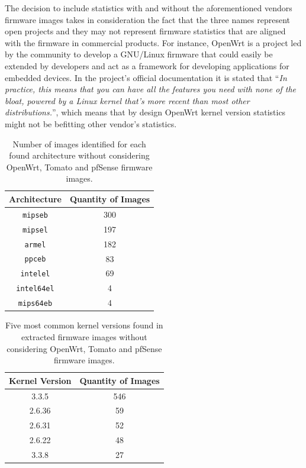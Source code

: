 The decision to include statistics with and without the aforementioned vendors firmware images takes in consideration the fact that the three names represent open projects and they may not represent firmware statistics that are aligned with the firmware in commercial products. For instance, OpenWrt is a project led by the community to develop a GNU/Linux firmware that could easily be extended by developers and act as a framework for developing applications for embedded devices. In the project's official documentation it is stated that ``\textit{In practice, this means that you can have all the features you need with none of the bloat, powered by a Linux kernel that's more recent than most other distributions.}'', which means that by design OpenWrt kernel version statistics might not be befitting other vendor's statistics.

\begin{table}[H]
\centering
\caption{Number of images identified for each found architecture without considering OpenWrt, Tomato and pfSense firmware images.}
\begin{tabular}{cc}
\hline
\textbf{Architecture}       & \textbf{Quantity of Images} \\ \hline
{\tt mipseb}                &  300                        \\ 
{\tt mipsel}                &  197                        \\ 
{\tt armel}                 &  182                        \\ 
{\tt ppceb}                 &   83                        \\ 
{\tt intelel}               &   69                        \\ 
{\tt intel64el}             &    4                        \\ 
{\tt mips64eb}              &    4                        \\ \hline
\end{tabular}
\label{tab:arch-stats}
\end{table}

\begin{table}[H]
\centering
\caption{Five most common kernel versions found in extracted firmware images without considering OpenWrt, Tomato and pfSense firmware images.}
\begin{tabular}{cc}
\hline
\textbf{Kernel Version} & \textbf{Quantity of Images} \\ \hline
3.3.5                  & 546                 \\
2.6.36                 &  59                 \\
2.6.31                 &  52                 \\
2.6.22                 &  48                 \\
3.3.8                  &  27                 \\ \hline
\end{tabular}
\label{tab:kernel-stats}
\end{table}

